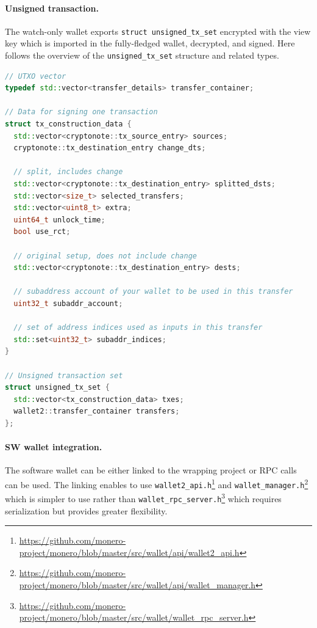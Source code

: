 \documentclass[]{article}
\begin{document}
\paragraph{Unsigned transaction.}
The watch-only wallet exports \verb|struct unsigned_tx_set| encrypted with the view key which is imported in the fully-fledged wallet, decrypted, and signed. Here follows the overview of the \verb|unsigned_tx_set| structure and related types.

\begin{lstlisting}[language=c++]
// UTXO vector
typedef std::vector<transfer_details> transfer_container;

// Data for signing one transaction
struct tx_construction_data {
  std::vector<cryptonote::tx_source_entry> sources;
  cryptonote::tx_destination_entry change_dts;
  
  // split, includes change
  std::vector<cryptonote::tx_destination_entry> splitted_dsts; 
  std::vector<size_t> selected_transfers;
  std::vector<uint8_t> extra;
  uint64_t unlock_time;
  bool use_rct;
  
  // original setup, does not include change
  std::vector<cryptonote::tx_destination_entry> dests; 
  
  // subaddress account of your wallet to be used in this transfer
  uint32_t subaddr_account;  
  
  // set of address indices used as inputs in this transfer
  std::set<uint32_t> subaddr_indices;  
}

// Unsigned transaction set
struct unsigned_tx_set {
  std::vector<tx_construction_data> txes;
  wallet2::transfer_container transfers;
};
\end{lstlisting}

\paragraph{SW wallet integration.} The software wallet can be either linked to the wrapping project or RPC calls can be used. The linking enables to use \verb|wallet2_api.h|\footnote{\url{https://github.com/monero-project/monero/blob/master/src/wallet/api/wallet2_api.h}} and \verb|wallet_manager.h|\footnote{\url{https://github.com/monero-project/monero/blob/master/src/wallet/api/wallet_manager.h}} which is simpler to use rather than \verb|wallet_rpc_server.h|\footnote{\url{https://github.com/monero-project/monero/blob/master/src/wallet/wallet_rpc_server.h}} which requires serialization but provides greater flexibility.
\end{document}
